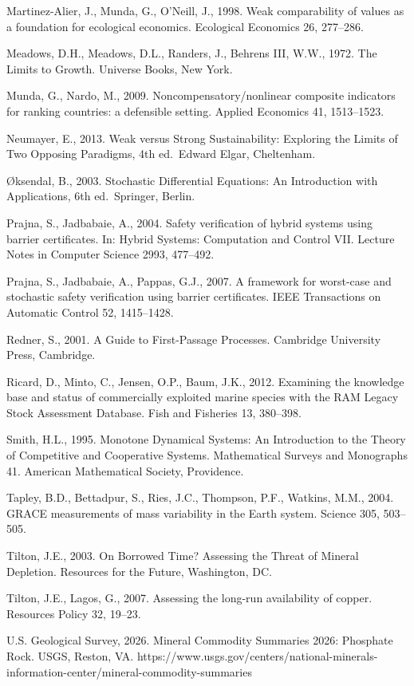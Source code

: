 \documentclass[11pt]{article}
\begin{document}
Martinez-Alier, J., Munda, G., O'Neill, J., 1998. Weak comparability of
values as a foundation for ecological economics. Ecological Economics
26, 277--286.

Meadows, D.H., Meadows, D.L., Randers, J., Behrens III, W.W., 1972. The
Limits to Growth. Universe Books, New York.

Munda, G., Nardo, M., 2009. Noncompensatory/nonlinear composite
indicators for ranking countries: a defensible setting. Applied
Economics 41, 1513--1523.

Neumayer, E., 2013. Weak versus Strong Sustainability: Exploring the
Limits of Two Opposing Paradigms, 4th ed.~Edward Elgar, Cheltenham.

\O{}ksendal, B., 2003. Stochastic Differential Equations: An Introduction
with Applications, 6th ed.~Springer, Berlin.

Prajna, S., Jadbabaie, A., 2004. Safety verification of hybrid systems using barrier certificates. In: Hybrid Systems: Computation and Control VII. Lecture Notes in Computer Science 2993, 477--492.

Prajna, S., Jadbabaie, A., Pappas, G.J., 2007. A framework for worst-case and stochastic safety verification using barrier certificates. IEEE Transactions on Automatic Control 52, 1415--1428.

Redner, S., 2001. A Guide to First-Passage Processes. Cambridge
University Press, Cambridge.

Ricard, D., Minto, C., Jensen, O.P., Baum, J.K., 2012. Examining the
knowledge base and status of commercially exploited marine species with
the RAM Legacy Stock Assessment Database. Fish and Fisheries 13,
380--398.

Smith, H.L., 1995. Monotone Dynamical Systems: An Introduction to the Theory of Competitive and Cooperative Systems. Mathematical Surveys and Monographs 41. American Mathematical Society, Providence.

Tapley, B.D., Bettadpur, S., Ries, J.C., Thompson, P.F., Watkins, M.M.,
2004. GRACE measurements of mass variability in the Earth system.
Science 305, 503--505.

Tilton, J.E., 2003. On Borrowed Time? Assessing the Threat of Mineral
Depletion. Resources for the Future, Washington, DC.

Tilton, J.E., Lagos, G., 2007. Assessing the long-run availability of
copper. Resources Policy 32, 19--23.

U.S. Geological Survey, 2026. Mineral Commodity Summaries 2026:
Phosphate Rock. USGS, Reston, VA.
https://www.usgs.gov/centers/national-minerals-information-center/mineral-commodity-summaries
\end{document}
